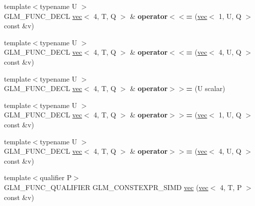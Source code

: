 \begin{DoxyCompactItemize}
{\footnotesize template$<$typename U $>$ }\\G\+L\+M\+\_\+\+F\+U\+N\+C\+\_\+\+D\+E\+CL \hyperlink{structglm_1_1vec}{vec}$<$ 4, T, Q $>$ \& {\bfseries operator$<$$<$=} (\hyperlink{structglm_1_1vec}{vec}$<$ 1, U, Q $>$ const \&v)
\item 
\mbox{\label{structglm_1_1vec_3_014_00_01T_00_01Q_01_4_aee9c69807b9f783f5b6801f86fe153d7}} 
{\footnotesize template$<$typename U $>$ }\\G\+L\+M\+\_\+\+F\+U\+N\+C\+\_\+\+D\+E\+CL \hyperlink{structglm_1_1vec}{vec}$<$ 4, T, Q $>$ \& {\bfseries operator$<$$<$=} (\hyperlink{structglm_1_1vec}{vec}$<$ 4, U, Q $>$ const \&v)
\item 
\mbox{\label{structglm_1_1vec_3_014_00_01T_00_01Q_01_4_a28cea4bef361cb5dd994a3912fb1e00e}} 
{\footnotesize template$<$typename U $>$ }\\G\+L\+M\+\_\+\+F\+U\+N\+C\+\_\+\+D\+E\+CL \hyperlink{structglm_1_1vec}{vec}$<$ 4, T, Q $>$ \& {\bfseries operator$>$$>$=} (U scalar)
\item 
\mbox{\label{structglm_1_1vec_3_014_00_01T_00_01Q_01_4_ab04515a0b171b86148f9cf04edfde65f}} 
{\footnotesize template$<$typename U $>$ }\\G\+L\+M\+\_\+\+F\+U\+N\+C\+\_\+\+D\+E\+CL \hyperlink{structglm_1_1vec}{vec}$<$ 4, T, Q $>$ \& {\bfseries operator$>$$>$=} (\hyperlink{structglm_1_1vec}{vec}$<$ 1, U, Q $>$ const \&v)
\item 
\mbox{\label{structglm_1_1vec_3_014_00_01T_00_01Q_01_4_af1c26b9e068a4ea0fdd6dbb554d27100}} 
{\footnotesize template$<$typename U $>$ }\\G\+L\+M\+\_\+\+F\+U\+N\+C\+\_\+\+D\+E\+CL \hyperlink{structglm_1_1vec}{vec}$<$ 4, T, Q $>$ \& {\bfseries operator$>$$>$=} (\hyperlink{structglm_1_1vec}{vec}$<$ 4, U, Q $>$ const \&v)
\item 
\mbox{\label{structglm_1_1vec_3_014_00_01T_00_01Q_01_4_a29d7b0c6bd124719542646f92272f061}} 
{\footnotesize template$<$qualifier P$>$ }\\G\+L\+M\+\_\+\+F\+U\+N\+C\+\_\+\+Q\+U\+A\+L\+I\+F\+I\+ER G\+L\+M\+\_\+\+C\+O\+N\+S\+T\+E\+X\+P\+R\+\_\+\+S\+I\+MD \hyperlink{structglm_1_1vec_3_014_00_01T_00_01Q_01_4_a29d7b0c6bd124719542646f92272f061}{vec} (\hyperlink{structglm_1_1vec}{vec}$<$ 4, T, P $>$ const \&v)

\end{DoxyCompactItemize}
